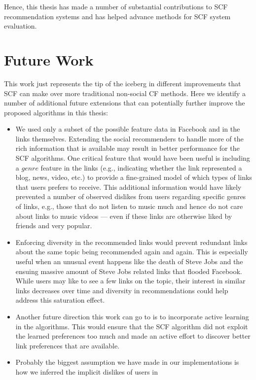 Hence, this thesis has made a number of substantial contributions to
SCF recommendation systems and has helped advance methods for
SCF system evaluation.  

\section{Future Work}

This work just represents the tip of the iceberg in different
improvements that SCF can make over more traditional non-social CF
methods.  Here we identify a number of additional future extensions
that can potentially further improve the proposed algorithms in this thesis:

\begin{itemize}
\item We used only a subset of the possible feature data in Facebook
and in the links themselves. Extending the social recommenders to
handle more of the rich information that is available may result in
better performance for the SCF algorithms. One critical feature that
would have been useful is including a $\mathit{genre}$ feature in the
links (e.g., indicating whether the link represented a blog, news,
video, etc.)  to provide a fine-grained model of which types of links
that users prefers to receive.  This additional information would have
likely prevented a number of observed dislikes from users regarding
specific genres of links, e.g., those that do not listen to
music much and hence do not care about links to music videos --- even
if these links are otherwise liked by friends and very popular.
\item Enforcing diversity in the recommended links would prevent
redundant links about the same topic being recommended again and
again. This is especially useful when an unusual event happens like
the death of Steve Jobs and the ensuing massive amount of Steve Jobs
related links that flooded Facebook.  While users may like to see a
few links on the topic, their interest in similar links decreases over
time and diversity in recommendations could help address this
saturation effect.
\item Another future direction this work can go to is to incorporate
active learning in the algorithms.  This would ensure that the SCF
algorithm did not exploit the learned preferences too much and made an
active effort to discover better link preferences that are available.
\item Probably the biggest assumption we have made in our
implementations is how we inferred the implicit dislikes of users in

\end{itemize}
